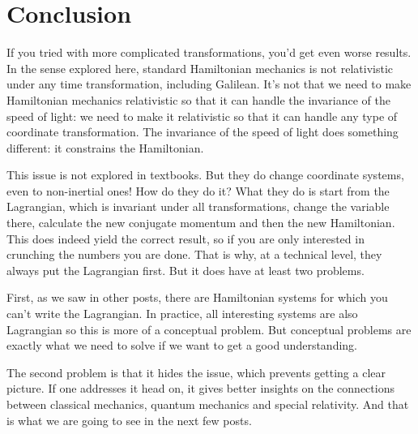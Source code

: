 \documentclass[aps,pra,10pt,floatfix,nofootinbib]{revtex4-1}
\theoremstyle{definition}
\begin{document}
\section{Conclusion}

If you tried with more complicated transformations, you'd get even worse results. In the sense explored here, standard Hamiltonian mechanics is not relativistic under any time transformation, including Galilean. It's not that we need to make Hamiltonian mechanics relativistic so that it can handle the invariance of the speed of light: we need to make it relativistic so that it can handle any type of coordinate transformation. The invariance of the speed of light does something different: it constrains the Hamiltonian.

This issue is not explored in textbooks. But they do change coordinate systems, even to non-inertial ones! How do they do it? What they do is start from the Lagrangian, which is invariant under all transformations, change the variable there, calculate the new conjugate momentum and then the new Hamiltonian. This does indeed yield the correct result, so if you are only interested in crunching the numbers you are done. That is why, at a technical level, they always put the Lagrangian first. But it does have at least two problems.

First, as we saw in other posts, there are Hamiltonian systems for which you can't write the Lagrangian. In practice, all interesting systems are also Lagrangian so this is more of a conceptual problem. But conceptual problems are exactly what we need to solve if we want to get a good understanding.

The second problem is that it hides the issue, which prevents getting a clear picture. If one addresses it head on, it gives better insights on the connections between classical mechanics, quantum mechanics and special relativity. And that is what we are going to see in the next few posts.
\end{document}
